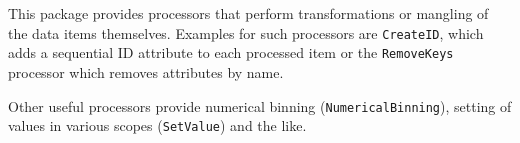 This package provides processors that perform transformations or
mangling of the data items themselves. Examples for such processors are
\texttt{CreateID}, which adds a sequential ID attribute to each
processed item or the \texttt{RemoveKeys} processor which removes
attributes by name.

Other useful processors provide numerical binning
(\texttt{NumericalBinning}), setting of values in various scopes
(\texttt{SetValue}) and the like.



%
%
%
%
%
%
%
%
%
%
%
%
%
%


%
